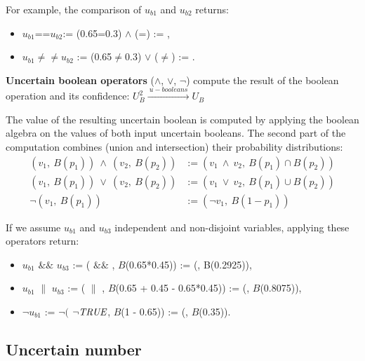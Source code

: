 For example, the comparison of $u_{b1}$ and $u_{b2}$ returns:
\begin{itemize}
	\item $u_{b1}$==$u_{b2}$:= (0.65=0.3) $\land$ (\true{}=\true{}) := \false{},
	\item $u_{b1}$$\ne\ne$$u_{b2}$ := (0.65$\ne$0.3) $\lor$ (\true{}$\ne$\true{}) := \true{}.
\end{itemize}

\begin{operator}
	\label{op:boolean}
	\textbf{Uncertain boolean operators} ($\land$, $\lor$, $\lnot$) compute the result of the boolean operation and its confidence: $U_B^2 \xrightarrow{~u-booleans~} U_B$
\end{operator}

The value of the resulting uncertain boolean is computed by applying the boolean algebra on the values of both input uncertain booleans.
The second part of the computation combines (union and intersection) their probability distributions:
\begin{align*}
	(v_1,~B(p_1))~\land~(v_2,~B(p_2)) &:= (v_1~\land~v_2,~B(p_1) \cap B(p_2))\\
	(v_1,~B(p_1))~\lor~(v_2,~B(p_2)) &:= (v_1~\lor~v_2,~B(p_1) \cup B(p_2))\\
	\lnot(v_1,~B(p_1)) &:= (\lnot v_1,~B(1-p_1))
\end{align*}

If we assume $u_{b1}$ and $u_{b3}$ independent and non-disjoint variables, applying these operators return:
\begin{itemize}
	\item $u_{b1}$ $\&\&$ $u_{b3}$ := (\true{} $\&\&$ \false{}, $B$(0.65*0.45)) := (\false{}, B(0.2925)),
	\item $u_{b1}$ $\|$ $u_{b3}$ := (\true{} $\|$ \true{}, $B$(0.65 + 0.45 - 0.65*0.45)) := (\true{}, $B$(0.8075)),
	\item $\lnot u_{b1}$ := $\lnot ($ $\lnot \textit{TRUE}{}$, $B$(1 - 0.65)) := (\false{}, $B$(0.35)).
\end{itemize}

\subsection{Uncertain number}
